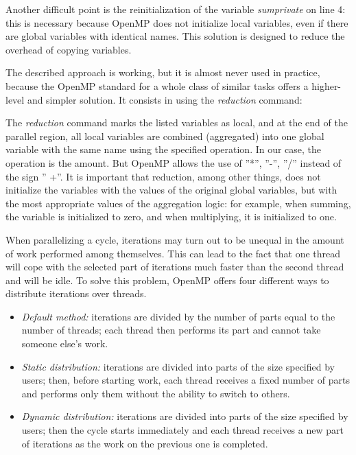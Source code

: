 {	\par Another difficult point is the reinitialization of the variable \textit{sum\textunderscore private} on line 4: this is necessary because OpenMP does not initialize local variables, even if there are global variables with identical names. This solution is designed to reduce the overhead of copying variables.
	\par The described approach is working, but it is almost never used in practice, because the OpenMP standard for a whole class of similar tasks offers a higher-level and simpler solution. It consists in using the \textit{reduction} command:
	\begin{figure}[H]
		
	\end{figure}
	\par The \textit{reduction} command marks the listed variables as local, and at the end of the parallel region, all local variables are combined (aggregated) into one global variable with the same name using the specified operation. In our case, the operation is the amount. But OpenMP allows the use of  ''*'', ''-'', ''/'' instead of the sign '' +''. It is important that reduction, among other things, does not initialize the variables with the values of the original global variables, but with the most appropriate values of the aggregation logic: for example, when summing, the variable is initialized to zero, and when multiplying, it is initialized to one.
	\par When parallelizing a cycle, iterations may turn out to be unequal in the amount of work performed among themselves. This can lead to the fact that one thread will cope with the selected part of iterations much faster than the second thread and will be idle. To solve this problem, OpenMP offers four different ways to distribute iterations over threads. 
	\begin{itemize}
		\item\textit{Default method:} iterations are divided by the number of parts equal to the number of threads; each thread then performs its part and cannot take someone else's work.
		\item\textit{Static distribution:} iterations are divided into parts of the size specified by users; then, before starting work, each thread receives a fixed number of parts and performs only them without the ability to switch to others.
		\item\textit{Dynamic distribution:} iterations are divided into parts of the size specified by users; then the cycle starts immediately and each thread receives a new part of iterations as the work on the previous one is completed.

\end{itemize}}
